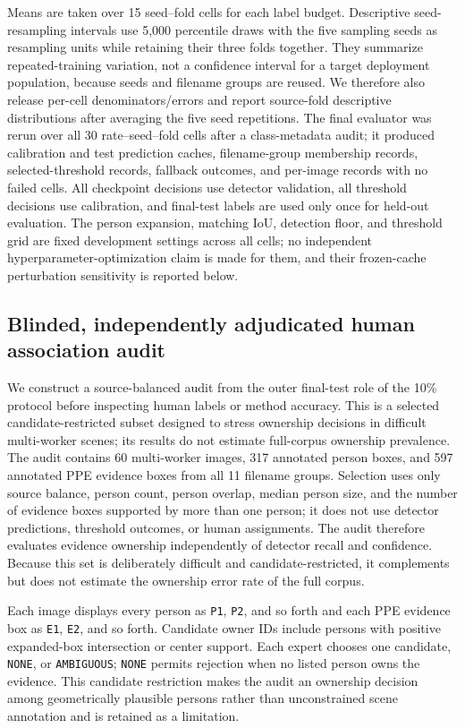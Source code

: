 \documentclass[iicol,pdflatex,sn-mathphys-num]{sn-jnl}
\begin{document}
Means are taken over 15 seed--fold cells for each label budget. Descriptive seed-resampling intervals use 5,000 percentile draws with the five sampling seeds as resampling units while retaining their three folds together. They summarize repeated-training variation, not a confidence interval for a target deployment population, because seeds and filename groups are reused. We therefore also release per-cell denominators/errors and report source-fold descriptive distributions after averaging the five seed repetitions. The final evaluator was rerun over all 30 rate--seed--fold cells after a class-metadata audit; it produced calibration and test prediction caches, filename-group membership records, selected-threshold records, fallback outcomes, and per-image records with no failed cells. All checkpoint decisions use detector validation, all threshold decisions use calibration, and final-test labels are used only once for held-out evaluation. The person expansion, matching IoU, detection floor, and threshold grid are fixed development settings across all cells; no independent hyperparameter-optimization claim is made for them, and their frozen-cache perturbation sensitivity is reported below.

\subsection{Blinded, independently adjudicated human association audit}\label{sec:humanprotocol}

We construct a source-balanced audit from the outer final-test role of the 10\% protocol before inspecting human labels or method accuracy. This is a selected candidate-restricted subset designed to stress ownership decisions in difficult multi-worker scenes; its results do not estimate full-corpus ownership prevalence. The audit contains 60 multi-worker images, 317 annotated person boxes, and 597 annotated PPE evidence boxes from all 11 filename groups. Selection uses only source balance, person count, person overlap, median person size, and the number of evidence boxes supported by more than one person; it does not use detector predictions, threshold outcomes, or human assignments. The audit therefore evaluates evidence ownership independently of detector recall and confidence. Because this set is deliberately difficult and candidate-restricted, it complements but does not estimate the ownership error rate of the full corpus.

Each image displays every person as \texttt{P1}, \texttt{P2}, and so forth and each PPE evidence box as \texttt{E1}, \texttt{E2}, and so forth. Candidate owner IDs include persons with positive expanded-box intersection or center support. Each expert chooses one candidate, \texttt{NONE}, or \texttt{AMBIGUOUS}; \texttt{NONE} permits rejection when no listed person owns the evidence. This candidate restriction makes the audit an ownership decision among geometrically plausible persons rather than unconstrained scene annotation and is retained as a limitation.
\end{document}
